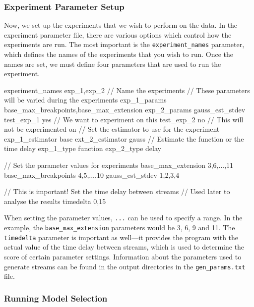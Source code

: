 \documentclass[a4paper,11pt]{article}
\begin{document}
\begin{appendices}
\subsubsection{Experiment Parameter Setup}
\label{sec-10-3-3}

    Now, we set up the experiments that we wish to perform on the data. In the
    experiment parameter file, there are various options which control how the
    experiments are run. The most important is the \texttt{experiment\_names}
    parameter, which defines the names of the experiments that you wish to run. Once
    the names are set, we must define four parameters that are used to run the experiment.
    \small
    \begin{verbatimtab}
    experiment_names exp_1,exp_2 // Name the experiments
    // These parameters will be varied during the experiments
    exp_1_params base_max_breakpoints,base_max_extension
    exp_2_params gauss_est_stdev
    test_exp_1 yes // We want to experiment on this
    test_exp_2 no // This will not be experimented on
    // Set the estimator to use for the experiment
    exp_1_estimator base 
    ext_2_estimator gauss
    // Estimate the function or the time delay
    exp_1_type function
    exp_2_type delay

    // Set the parameter values for experiments
    base_max_extension 3,6,...,11
    base_max_breakpoints 4,5,...,10
    gauss_est_stdev 1,2,3,4

    // This is important! Set the time delay between streams
    // Used later to analyse the results
    timedelta 0,15
    \end{verbatimtab}
    \normalsize

    When setting the parameter values, \texttt{...} can be used to specify a
    range. In the example, the \texttt{base\_max\_extension} parameters would be 3,
    6, 9 and 11. The \texttt{timedelta} parameter is important as well---it provides
    the program with the actual value of the time delay between streams, which is
    used to determine the score of certain parameter settings. Information about the
    parameters used to generate streams can be found in the output directories in
    the \texttt{gen\_params.txt} file.
\subsubsection{Running Model Selection}
\label{sec-10-3-4}


\end{appendices}
\end{document}
